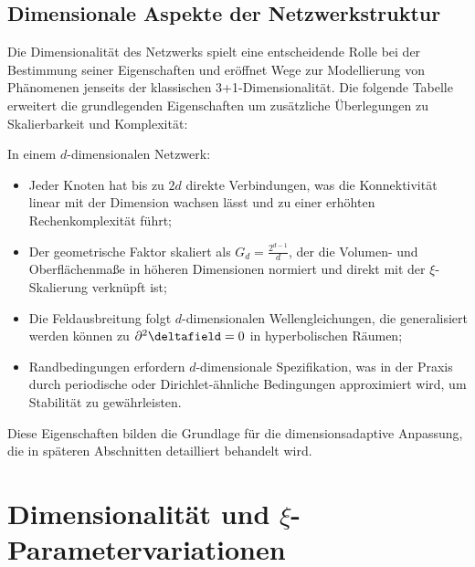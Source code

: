 \subsection{Dimensionale Aspekte der Netzwerkstruktur}
\label{subsec:dimensional_aspects}
Die Dimensionalität des Netzwerks spielt eine entscheidende Rolle bei der Bestimmung seiner Eigenschaften und eröffnet Wege zur Modellierung von Phänomenen jenseits der klassischen 3+1-Dimensionalität. Die folgende Tabelle erweitert die grundlegenden Eigenschaften um zusätzliche Überlegungen zu Skalierbarkeit und Komplexität:
\begin{overview}
	In einem $d$-dimensionalen Netzwerk:
	\begin{itemize}
		\item Jeder Knoten hat bis zu $2d$ direkte Verbindungen, was die Konnektivität linear mit der Dimension wachsen lässt und zu einer erhöhten Rechenkomplexität führt;
		\item Der geometrische Faktor skaliert als $G_d = \frac{2^{d-1}}{d}$, der die Volumen- und Oberflächenmaße in höheren Dimensionen normiert und direkt mit der $\xi$-Skalierung verknüpft ist;
		\item Die Feldausbreitung folgt $d$-dimensionalen Wellengleichungen, die generalisiert werden können zu $\partial^2 \deltafield = 0$ in hyperbolischen Räumen;
		\item Randbedingungen erfordern $d$-dimensionale Spezifikation, was in der Praxis durch periodische oder Dirichlet-ähnliche Bedingungen approximiert wird, um Stabilität zu gewährleisten.
	\end{itemize}
\end{overview}
Diese Eigenschaften bilden die Grundlage für die dimensionsadaptive Anpassung, die in späteren Abschnitten detailliert behandelt wird.
\section{Dimensionalität und $\xi$-Parametervariationen}
\label{sec:dimensionality_xi}
